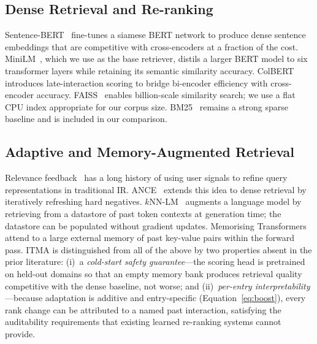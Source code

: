 \documentclass[preprint,12pt]{elsarticle}
\begin{document}
\subsection{Dense Retrieval and Re-ranking}
Sentence-BERT~\citep{reimers2019sbert} fine-tunes a siamese BERT network to
produce dense sentence embeddings that are competitive with cross-encoders at
a fraction of the cost.  MiniLM~\citep{wang2020minilm}, which we use as the
base retriever, distils a larger BERT model to six transformer layers while
retaining its semantic similarity accuracy.  ColBERT~\citep{khattab2020colbert}
introduces late-interaction scoring to bridge bi-encoder efficiency with
cross-encoder accuracy.  FAISS~\citep{johnson2021faiss} enables billion-scale
similarity search; we use a flat CPU index appropriate for our corpus size.
BM25~\citep{robertson2009bm25} remains a strong sparse baseline and is
included in our comparison.

\subsection{Adaptive and Memory-Augmented Retrieval}
Relevance feedback~\citep{rocchio1971relevance,lavrenko2001relevance} has a
long history of using user signals to refine query representations in
traditional IR.  ANCE~\citep{xiong2020ance} extends this idea to dense
retrieval by iteratively refreshing hard negatives.
$k$NN-LM~\citep{khandelwal2021knn} augments a language model by retrieving
from a datastore of past token contexts at generation time; the datastore can
be populated without gradient updates.  Memorising
Transformers~\citep{wu2022memorizing} attend to a large external memory of past
key-value pairs within the forward pass.  ITMA is distinguished from all of the above by two properties absent in the
prior literature: (i)~a \emph{cold-start safety guarantee}---the scoring head
is pretrained on held-out domains so that an empty memory bank produces
retrieval quality competitive with the dense baseline, not worse; and
(ii)~\emph{per-entry interpretability}---because adaptation is additive and
entry-specific (Equation~\ref{eq:boost}), every rank change can be attributed
to a named past interaction, satisfying the auditability requirements that
existing learned re-ranking systems cannot provide.
\end{document}
